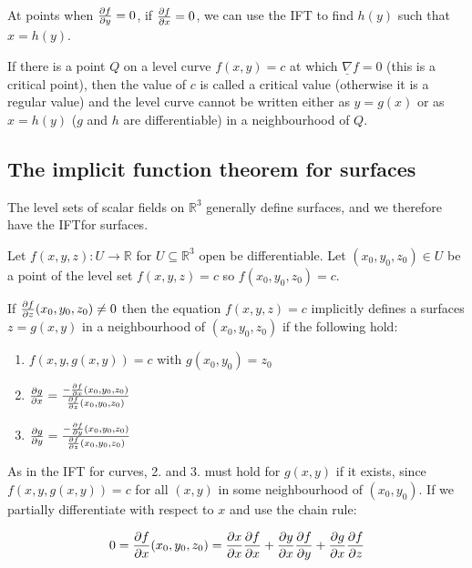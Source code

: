 \begin{remark}
	At points when $\diffp{f}{y} = 0$, if $\diffp{f}{x} = 0$, we can use the IFT to find $h(y)$ such that $x = h(y)$.
\end{remark}

\begin{remark}
	If there is a point $Q$ on a level curve $f(x, y) = c$ at which $\underline{\nabla} f = 0$ (this is a critical point), then the value of $c$ is called a critical value (otherwise it is a regular value) and the level curve cannot be written either as $y = g(x)$ or as $x = h(y)$ ($g$ and $h$ are differentiable) in a neighbourhood of $Q$.
\end{remark}

\subsection{The implicit function theorem for surfaces}

The level sets of scalar fields on $\mathbb{R}^3$ generally define surfaces, and we therefore have the IFTfor surfaces.

\begin{theorem}
	Let $f(x, y, z): U \rightarrow \mathbb{R}$ for $U \subseteq \mathbb{R}^3$ open be differentiable. Let $(x_0, y_0, z_0) \in U$ be a point of the level set $f(x, y, z) = c$ so $f(x_0, y_0, z_0) = c$.

	If $\diffp{f}{z} (x_0, y_0, z_0) \ne 0$ then the equation $f(x, y, z) = c$ implicitly defines a surfaces $z = g(x, y)$ in a neighbourhood of $(x_0, y_0, z_0)$ if the following hold:
	\begin{enumerate}
		\item $f(x, y, g(x, y)) = c$ with $g(x_0, y_0) = z_0$
		\item $\diffp{g}{x} = \frac{-\diffp{f}{x} (x_0, y_0, z_0)}{\diffp{f}{z} (x_0, y_0, z_0)}$
		\item $\diffp{g}{y} = \frac{-\diffp{f}{y} (x_0, y_0, z_0)}{\diffp{f}{z} (x_0, y_0, z_0)}$
	\end{enumerate}
\end{theorem}

As in the IFT for curves, 2. and 3. must hold for $g(x, y)$ if it exists, since $f(x, y, g(x, y)) = c$ for all $(x, y)$ in some neighbourhood of $(x_0, y_0)$. If we partially differentiate with respect to $x$ and use the chain rule:

\[0 = \diffp{f}{x} (x_0, y_0, z_0) = \diffp{x}{x} \diffp{f}{x} + \diffp{y}{x}\diffp{f}{y} + \diffp{g}{x}\diffp{f}{z}\]

